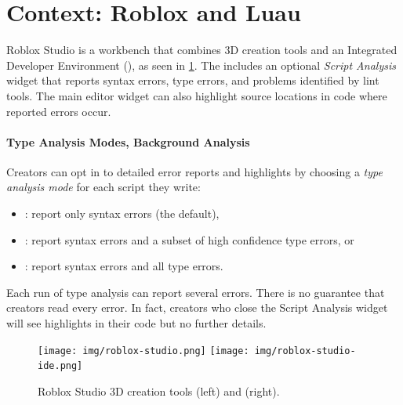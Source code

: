 \documentclass[english,submission,cleveref]{programming}
\begin{document}
\section{Context: {Roblox} and {Luau}}
\label{s:context}



{Roblox Studio} is a workbench that
combines {3D creation} tools and an Integrated
Developer Environment (\IDE{}), as seen in \cref{fig:roblox-studio}.
The \IDE{} includes an optional \emph{Script Analysis} widget that
reports syntax errors, type errors, and problems identified by
lint tools. The main editor widget can also highlight
source locations in code where reported errors occur.


\paragraph{Type Analysis Modes, Background Analysis}

Creators can opt in to detailed error reports and highlights by
choosing a \emph{type analysis mode} for each script they write:
\begin{itemize}
  \item \mnocheck{}: report only syntax errors (the default),
  \item \mnonstrict{}: report syntax errors and a subset of high confidence type errors, or
  \item \mstrict{}: report syntax errors and all type errors.
\end{itemize}
Each run of type analysis can report several errors.
There is no guarantee that creators read every error.
In fact, creators who close the Script Analysis widget
will see highlights in their code but no further details.

\begin{figure}[t]\centering
  \texttt{[image: img/roblox-studio.png]}
  \hspace{1cm}
  \texttt{[image: img/roblox-studio-ide.png]}
  \caption{{Roblox Studio 3D creation} tools (left) and \IDE{} (right).}
  \label{fig:roblox-studio}
\end{figure}
\end{document}
